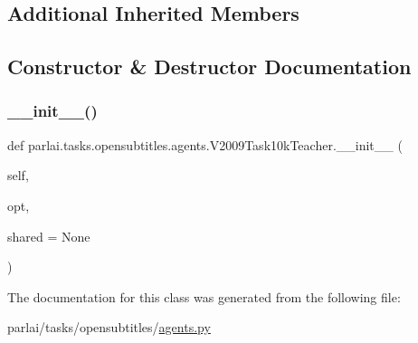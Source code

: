 \subsection*{Additional Inherited Members}


\subsection{Constructor \& Destructor Documentation}
\mbox{\label{classparlai_1_1tasks_1_1opensubtitles_1_1agents_1_1V2009Task10kTeacher_af0a8a8e3a7a2c7b7cea42965f8b08afc}} 
\subsubsection{\texorpdfstring{\+\_\+\+\_\+init\+\_\+\+\_\+()}{\_\_init\_\_()}}
{\footnotesize\ttfamily def parlai.\+tasks.\+opensubtitles.\+agents.\+V2009\+Task10k\+Teacher.\+\_\+\+\_\+init\+\_\+\+\_\+ (\begin{DoxyParamCaption}\item[{}]{self,  }\item[{}]{opt,  }\item[{}]{shared = {\ttfamily None} }\end{DoxyParamCaption})}



The documentation for this class was generated from the following file\+:\begin{DoxyCompactItemize}
\item 
parlai/tasks/opensubtitles/\hyperlink{parlai_2tasks_2opensubtitles_2agents_8py}{agents.\+py}\end{DoxyCompactItemize}
